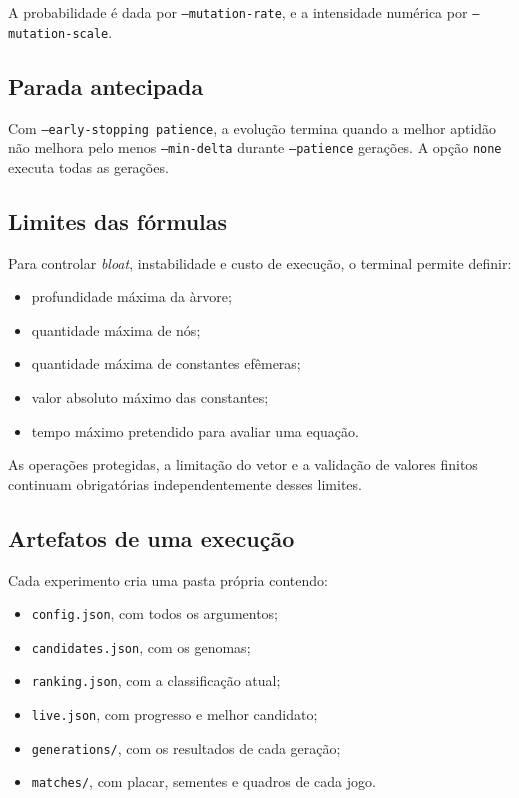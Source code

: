 \documentclass[12pt,a4paper]{article}
\begin{document}
A probabilidade \'e dada por \texttt{--mutation-rate}, e a intensidade num\'erica por \texttt{--mutation-scale}.

\subsection{Parada antecipada}

Com \texttt{--early-stopping patience}, a evolu\c{c}\~ao termina quando a melhor aptid\~ao n\~ao melhora pelo menos \texttt{--min-delta} durante \texttt{--patience} gera\c{c}\~oes. A op\c{c}\~ao \texttt{none} executa todas as gera\c{c}\~oes.

\subsection{Limites das f\'ormulas}

Para controlar \textit{bloat}, instabilidade e custo de execu\c{c}\~ao, o terminal permite definir:

\begin{itemize}
  \item profundidade m\'axima da \`arvore;
  \item quantidade m\'axima de n\'os;
  \item quantidade m\'axima de constantes ef\^emeras;
  \item valor absoluto m\'aximo das constantes;
  \item tempo m\'aximo pretendido para avaliar uma equa\c{c}\~ao.
\end{itemize}

As opera\c{c}\~oes protegidas, a limita\c{c}\~ao do vetor e a valida\c{c}\~ao de valores finitos continuam obrigat\'orias independentemente desses limites.

\subsection{Artefatos de uma execu\c{c}\~ao}

Cada experimento cria uma pasta pr\'opria contendo:

\begin{itemize}
  \item \texttt{config.json}, com todos os argumentos;
  \item \texttt{candidates.json}, com os genomas;
  \item \texttt{ranking.json}, com a classifica\c{c}\~ao atual;
  \item \texttt{live.json}, com progresso e melhor candidato;
  \item \texttt{generations/}, com os resultados de cada gera\c{c}\~ao;
  \item \texttt{matches/}, com placar, sementes e quadros de cada jogo.
\end{itemize}
\end{document}
